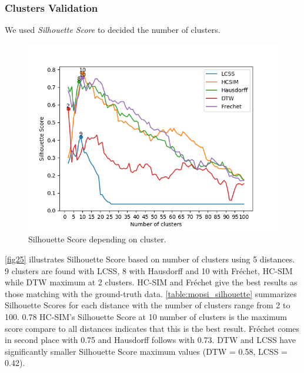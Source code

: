 \documentclass[a4paper, 12pt]{article}
\begin{document}
\pagebreak

\subsubsection{Clusters Validation}

We used \textit{Silhouette Score} to decided the number of clusters.

\begin{figure}[htbp!]
    \centering
    \includegraphics[width=1\textwidth]{distance_compare.png}
    \caption{Silhouette Score depending on cluster.}
    \label{fig25}
\end{figure}

\pagebreak

\autoref{fig25} illustrates Silhouette Score based on number of clusters using 5 distances. 9 clusters are found with LCSS, 8 with Hausdorff and 10 with Fréchet, HC-SIM while DTW maximum at 2 clusters. HC-SIM and Fréchet give the best results as those matching with the ground-truth data. \autoref{table:mopsi_silhouette} summarizes Silhouette Scores for each distance with the number of clusters range from 2 to 100. 0.78 HC-SIM's Silhouette Score at 10 number of clusters is the maximum score compare to all distances indicates that this is the best result. Fréchet comes in second place with 0.75 and Hausdorff follows with 0.73. DTW and LCSS have significantly smaller Silhouette Score maximum values (DTW = 0.58, LCSS = 0.42).
\end{document}
